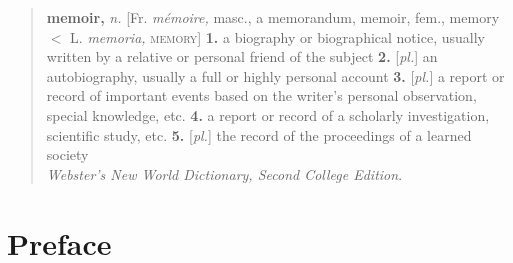 \documentclass[10pt,letterpaper]{memoir}
\begin{document}
\vspace{2\baselineskip}

\begin{quote}
\textbf{memoir,} \textit{n.} [Fr. \textit{m\'{e}moire,} masc., a memorandum,
    memoir, fem., memory $<$ L. \textit{memoria,} \textsc{memory}]
  \hspace{1ex} \textbf{1.} a biography or biographical notice, 
      usually written by a relative or personal friend of the subject 
  \hspace{1ex} \textbf{2.} [\textit{pl.}] an autobiography, 
      usually a full or highly personal account
  \hspace{1ex} \textbf{3.} [\textit{pl.}] a report or record of 
      important events based on the writer's personal observation, 
      special knowledge, etc.
  \hspace{1ex} \textbf{4.} a report or record of a scholarly 
      investigation, scientific study, etc.
  \hspace{1ex} \textbf{5.} [\textit{pl.}] the record of the proceedings
      of a learned society \\[0.5\baselineskip]
  \hspace*{\fill} \textit{Webster's New World Dictionary, Second College Edition}.
\end{quote}

%

\vspace*{\fill}

\cleardoublepage

\pagestyle{headings}

\tableofcontents
\clearpage
\listoffigures
\clearpage
\listoftables

\chapter{Preface}
\end{document}
